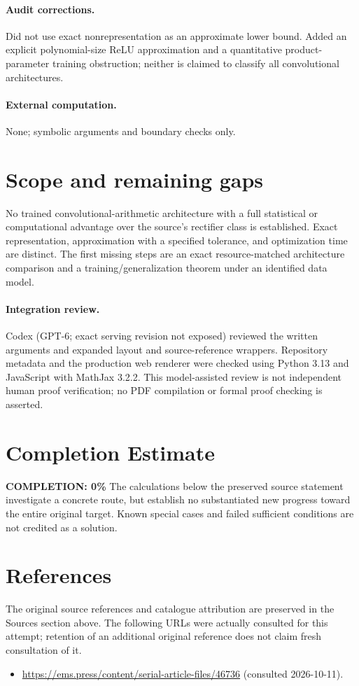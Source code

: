 \documentclass[11pt]{article}
\begin{document}
\paragraph{Audit corrections.} Did not use exact nonrepresentation as an approximate lower bound. Added an explicit polynomial-size ReLU approximation and a quantitative product-parameter training obstruction; neither is claimed to classify all convolutional architectures.
\paragraph{External computation.} None; symbolic arguments and boundary checks only.
\section{Scope and remaining gaps}
No trained convolutional-arithmetic architecture with a full statistical or computational advantage over the source's rectifier class is established. Exact representation, approximation with a specified tolerance, and optimization time are distinct. The first missing steps are an exact resource-matched architecture comparison and a training/generalization theorem under an identified data model.
\paragraph{Integration review.} Codex (GPT-6; exact serving revision not exposed) reviewed the written arguments and expanded layout and source-reference wrappers. Repository metadata and the production web renderer were checked using Python 3.13 and JavaScript with MathJax 3.2.2. This model-assisted review is not independent human proof verification; no PDF compilation or formal proof checking is asserted.

\section{Completion Estimate}
\noindent\textbf{COMPLETION: 0\%}
The calculations below the preserved source statement investigate a concrete route,
but establish no substantiated new progress toward the entire original target.
Known special cases and failed sufficient conditions are not credited as a solution.
\section{References}
The original source references and catalogue attribution are preserved in the
Sources section above. The following URLs were actually consulted for this attempt;
retention of an additional original reference does not claim fresh consultation of it.
\begin{itemize}
\item \url{https://ems.press/content/serial-article-files/46736} (consulted 2026-10-11). 
\end{itemize}
\end{document}
